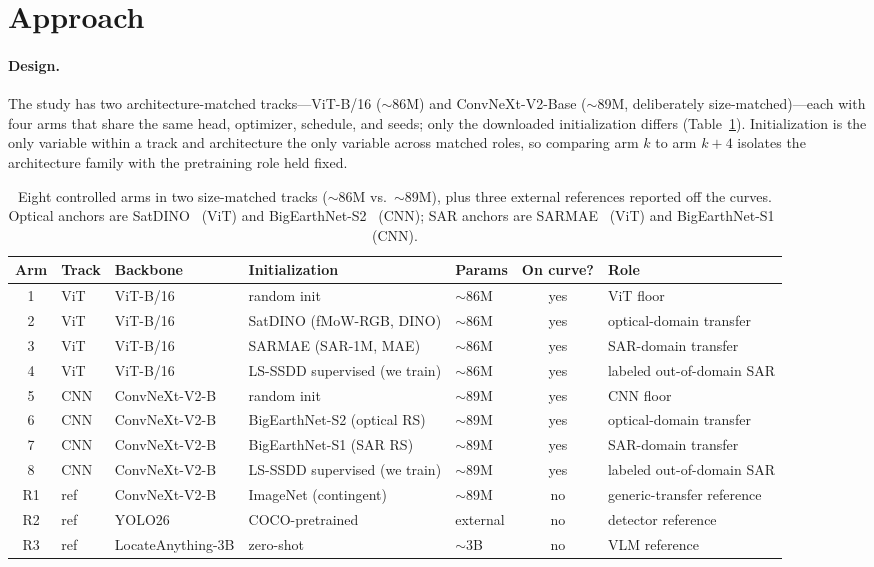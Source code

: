 \documentclass[10pt,twocolumn,letterpaper]{article}
\begin{document}
\section{Approach}
\label{sec:approach}

\paragraph{Design.} The study has two architecture-matched tracks---ViT-B/16
($\sim$86M) and ConvNeXt-V2-Base ($\sim$89M, deliberately size-matched)---each
with four arms that share the same head, optimizer, schedule, and seeds; only
the downloaded initialization differs (Table~\ref{tab:arms}). Initialization is
the only variable within a track and architecture the only variable across
matched roles, so comparing arm $k$ to arm $k{+}4$ isolates the architecture
family with the pretraining role held fixed.

\begin{table}[t]
\centering
\small
\setlength{\tabcolsep}{5pt}
\begin{tabular}{@{}cllllcl@{}}
\toprule
\textbf{Arm} & \textbf{Track} & \textbf{Backbone} & \textbf{Initialization} & \textbf{Params} & \textbf{On curve?} & \textbf{Role} \\
\midrule
1 & ViT & ViT-B/16 & random init & $\sim$86M & yes & ViT floor \\
2 & ViT & ViT-B/16 & SatDINO (fMoW-RGB, DINO) & $\sim$86M & yes & optical-domain transfer \\
3 & ViT & ViT-B/16 & SARMAE (SAR-1M, MAE) & $\sim$86M & yes & SAR-domain transfer \\
4 & ViT & ViT-B/16 & LS-SSDD supervised (we train) & $\sim$86M & yes & labeled out-of-domain SAR \\
5 & CNN & ConvNeXt-V2-B & random init & $\sim$89M & yes & CNN floor \\
6 & CNN & ConvNeXt-V2-B & BigEarthNet-S2 (optical RS) & $\sim$89M & yes & optical-domain transfer \\
7 & CNN & ConvNeXt-V2-B & BigEarthNet-S1 (SAR RS) & $\sim$89M & yes & SAR-domain transfer \\
8 & CNN & ConvNeXt-V2-B & LS-SSDD supervised (we train) & $\sim$89M & yes & labeled out-of-domain SAR \\
\addlinespace
R1 & ref & ConvNeXt-V2-B & ImageNet (contingent) & $\sim$89M & no & generic-transfer reference \\
R2 & ref & YOLO26 & COCO-pretrained & external & no & detector reference \\
R3 & ref & LocateAnything-3B & zero-shot & $\sim$3B & no & VLM reference \\
\bottomrule
\end{tabular}
\caption{Eight controlled arms in two size-matched tracks ($\sim$86M vs.\
$\sim$89M), plus three external references reported off the curves. Optical
anchors are SatDINO~\cite{straka2025satdino} (ViT) and
BigEarthNet-S2~\cite{clasen2025reben} (CNN); SAR anchors are
SARMAE~\cite{liu2026sarmae} (ViT) and BigEarthNet-S1~\cite{clasen2025reben} (CNN).}
\label{tab:arms}
\end{table}
\end{document}
